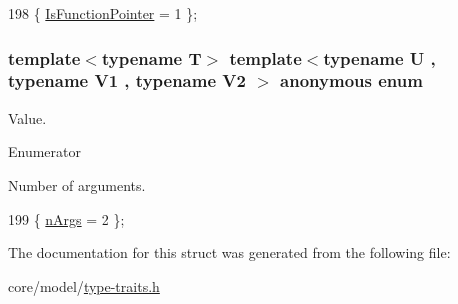 \begin{DoxyCode}
198 \{ \hyperlink{structTypeTraits_1_1FunctionPtrTraits_3_01U_07_5_08_07V1_00_01V2_08_4_a7174898c28b3492c5115774a13e19211a044f925811737913e50ed579c4ea0163}{IsFunctionPointer} = 1    \};
\end{DoxyCode}
\subsubsection[{\texorpdfstring{anonymous enum}{anonymous enum}}]{\setlength{\rightskip}{0pt plus 5cm}template$<$typename T$>$ template$<$typename U , typename V1 , typename V2 $>$ anonymous enum}\hypertarget{structTypeTraits_1_1FunctionPtrTraits_3_01U_07_5_08_07V1_00_01V2_08_4_a1b0f7a4a6b43cd1ed0dc19694d246e9c}{}\label{structTypeTraits_1_1FunctionPtrTraits_3_01U_07_5_08_07V1_00_01V2_08_4_a1b0f7a4a6b43cd1ed0dc19694d246e9c}
Value. \begin{Desc}
\item[Enumerator]\par
\begin{description}
\item[{\em 
n\+Args\hypertarget{structTypeTraits_1_1FunctionPtrTraits_3_01U_07_5_08_07V1_00_01V2_08_4_a1b0f7a4a6b43cd1ed0dc19694d246e9caef3c1f024ce240558cceffc98834aaa2}{}\label{structTypeTraits_1_1FunctionPtrTraits_3_01U_07_5_08_07V1_00_01V2_08_4_a1b0f7a4a6b43cd1ed0dc19694d246e9caef3c1f024ce240558cceffc98834aaa2}
}]Number of arguments. \end{description}
\end{Desc}

\begin{DoxyCode}
199 \{ \hyperlink{structTypeTraits_1_1FunctionPtrTraits_3_01U_07_5_08_07V1_00_01V2_08_4_a1b0f7a4a6b43cd1ed0dc19694d246e9caef3c1f024ce240558cceffc98834aaa2}{nArgs} = 2                \};
\end{DoxyCode}


The documentation for this struct was generated from the following file\+:\begin{DoxyCompactItemize}
\item 
core/model/\hyperlink{type-traits_8h}{type-\/traits.\+h}\end{DoxyCompactItemize}
